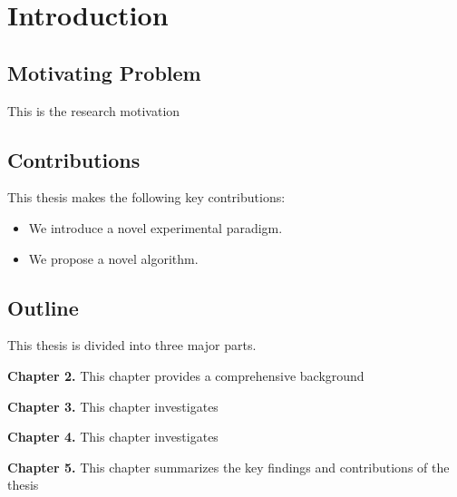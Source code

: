 \chapter{Introduction}
\label{chapter1}

\section{Motivating Problem}
\label{ch1:sec:motivation}
\begin{paragraph}
This is the research motivation 
\end{paragraph}




\section{Contributions}
\label{ch1:sec:Contributions}
\begin{paragraph}
This thesis makes the following key contributions:
\end{paragraph}

\begin{itemize}[leftmargin=\paritemindent]
    \item We introduce a novel experimental paradigm.
    \item We propose a novel algorithm.
\end{itemize}


\section{Outline}
\label{ch1:sec:Outline}
\begin{paragraph}
This thesis is divided into three major parts.

\textbf{Chapter 2.} This chapter provides a comprehensive background

\textbf{Chapter 3.} This chapter investigates

\textbf{Chapter 4.} This chapter investigates

\textbf{Chapter 5.} This chapter summarizes the key findings and contributions of the thesis


\end{paragraph}
